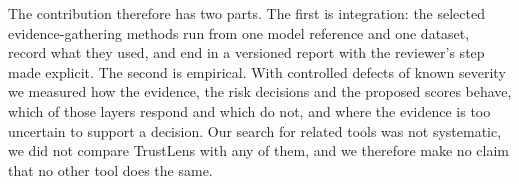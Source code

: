 The contribution therefore has two parts. The first is integration: the selected evidence-gathering methods run from one model reference and one dataset, record what they used, and end in a versioned report with the reviewer's step made explicit. The second is empirical. With controlled defects of known severity we measured how the evidence, the risk decisions and the proposed scores behave, which of those layers respond and which do not, and where the evidence is too uncertain to support a decision. Our search for related tools was not systematic, we did not compare TrustLens with any of them, and we therefore make no claim that no other tool does the same.
